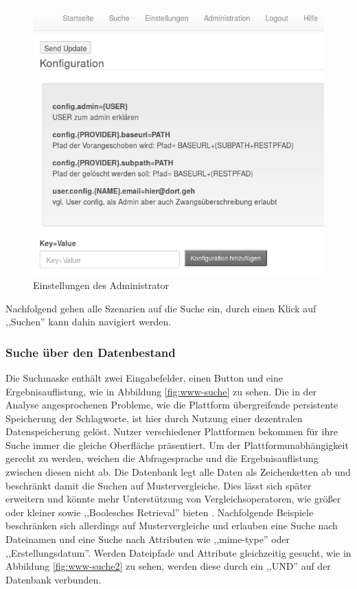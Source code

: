 \documentclass[oneside, ngerman, toc=bibliography,bibliography=totoc,listof=entryprefix, open=right,numbers=noenddot,fontsize=12pt]{scrbook}
\begin{document}
\begin{figure}[htbp] 
    \centering
    \includegraphics[width=\textwidth]{Masterarbeit_Bilder/www_einstellungen_admin.png}
    \caption{Einstellungen des Administrator}
    \label{fig:www-einstellungen-admin}
\end{figure}  



Nachfolgend gehen alle Szenarien auf die Suche ein, durch einen Klick auf ,,Suchen'' kann dahin navigiert werden. 



\subsubsection{Suche über den Datenbestand}
Die Suchmaske enthält  zwei Eingabefelder, einen Button und eine Ergebnisauflistung, wie in Abbildung \ref{fig:www-suche} zu sehen.
Die in der Analyse angesprochenen Probleme, wie die Plattform übergreifende persistente Speicherung der Schlagworte, ist hier durch Nutzung einer dezentralen Datenspeicherung gelöst. Nutzer verschiedener Plattformen bekommen  für ihre Suche immer die gleiche Oberfläche präsentiert. Um der Plattformunabhängigkeit gerecht zu werden, weichen die Abfragesprache und die Ergebnisauflistung zwischen diesen nicht ab. Die Datenbank legt alle Daten als Zeichenketten ab und beschränkt damit die Suchen auf Mustervergleiche. Dies lässt sich später erweitern und könnte mehr Unterstützung von Vergleichsoperatoren, wie größer oder kleiner sowie ,,Boolesches Retrieval'' bieten \cite{kuhlen2013grundlagen}. Nachfolgende Beispiele beschränken sich allerdings auf Mustervergleiche und erlauben eine Suche nach Dateinamen und eine Suche nach Attributen wie ,,mime-type'' oder ,,Erstellungsdatum''.
Werden Dateipfade und Attribute gleichzeitig gesucht, wie in Abbildung \ref{fig:www-suche2} zu sehen, werden diese durch ein ,,UND'' auf der Datenbank verbunden.
\end{document}
